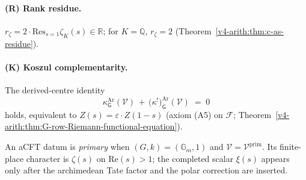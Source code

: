 \begin{definition}
\paragraph{(R) Rank residue.}
\(r_{\zeta}=2\cdot\mathrm{Res}_{s=1}\zeta_{K}(s)\in\mathbb{R}\); for
\(K=\mathbb{Q}\), \(r_{\zeta}=2\)
(Theorem~\ref{v4-arith:thm:c-as-residue}).

\paragraph{(K) Koszul complementarity.} The derived-centre
identity
\begin{equation*}
\kappa^{\mathrm{Ar}}_{\mathsf{G}}(\mathcal{V})\,+\,\bigl(\kappa^{!}\bigr)^{\mathrm{Ar}}_{\mathsf{G}}(\mathcal{V})\;=\;0
\end{equation*}
holds, equivalent to \(Z(s)=\varepsilon\cdot Z(1-s)\) (axiom (A5) on
\(\mathcal{F}\); Theorem~\ref{v4-arith:thm:G-row-Riemann-functional-equation}).

\medskip
An aCFT datum is \emph{primary} when \((G,k)=(\mathbb{G}_{m},1)\) and
\(\mathcal{V}=\mathcal{V}^{\mathrm{prim}}\).  Its finite-place
character is \(\zeta(s)\) on \(\mathrm{Re}(s)>1\); the completed scalar
\(\xi(s)\) appears only after the archimedean Tate factor and the
polar correction are inserted.
\end{definition}

